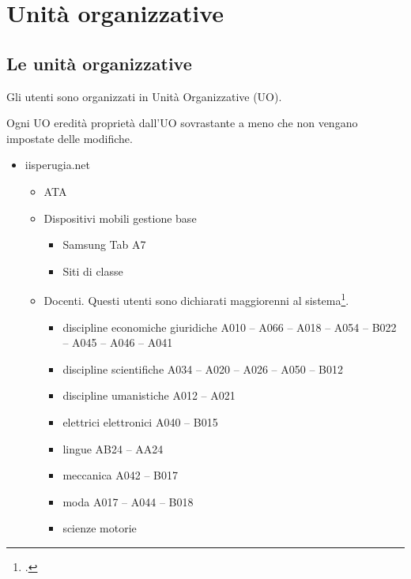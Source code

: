 \chapter{Unità organizzative}
\section{Le unità organizzative}
Gli utenti sono organizzati in Unità Organizzative (UO). 

Ogni UO eredità proprietà dall'UO sovrastante a meno che non vengano impostate delle modifiche.
\begin{itemize}
	\item iisperugia.net
	\begin{itemize}
		\item ATA
		\item Dispositivi mobili gestione base
		\begin{itemize}
			\item Samsung Tab A7
			\item Siti di classe
		\end{itemize}
	\item Docenti. Questi utenti sono dichiarati maggiorenni al sistema\footcite{Google2021b}.
	\begin{itemize}
		\item discipline economiche giuridiche A010 – A066 – A018 – A054 – B022 – A045 – A046 – A041
		\item discipline scientifiche
		A034 – A020 – A026 – A050 – B012
		\item discipline umanistiche
		A012 – A021
		\item elettrici elettronici
		A040 – B015
		\item lingue
		AB24 – AA24
		\item meccanica
		A042 – B017
		\item moda
		A017 – A044 – B018
		\item scienze motorie

\end{itemize}
\end{itemize}
\end{itemize}
